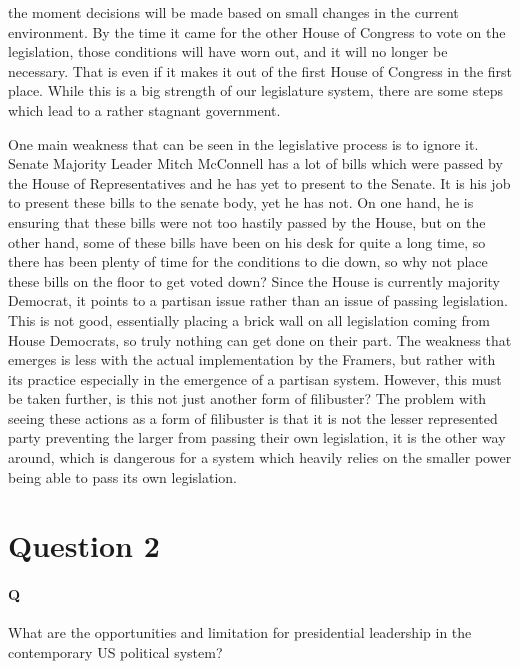 \documentclass[12pt]{article}
\begin{document}
the moment decisions will be made based on small changes in the
current environment. By the time it came for the other House of
Congress to vote on the legislation, those conditions will have worn
out, and it will no longer be necessary. That is even if it makes it
out of the first House of Congress in the first place. While this is a
big strength of our legislature system, there are some steps which
lead to a rather stagnant government.
\par
One main weakness that can be seen in the legislative process is to
ignore it. Senate Majority Leader Mitch McConnell has a lot of bills
which were passed by the House of Representatives and he has yet to
present to the Senate. It is his job to present these bills to the
senate body, yet he has not. On one hand, he is ensuring that these
bills were not too hastily passed by the House, but on the other hand,
some of these bills have been on his desk for quite a long time, so
there has been plenty of time for the conditions to die down, so why
not place these bills on the floor to get voted down? Since the House
is currently majority Democrat, it points to a partisan issue rather
than an issue of passing legislation. This is not good, essentially
placing a brick wall on all legislation coming from House Democrats,
so truly nothing can get done on their part. The weakness that emerges
is less with the actual implementation by the Framers, but rather with
its practice especially in the emergence of a partisan system.
However, this must be taken further, is this not just another form of
filibuster? The problem with seeing these actions as a form of
filibuster is that it is not the lesser represented party preventing
the larger from passing their own legislation, it is the other way
around, which is dangerous for a system which heavily relies on the
smaller power being able to pass its own legislation. 
\section*{Question 2}
\paragraph{Q}
What are the opportunities and limitation for presidential leadership
in the contemporary US political system?
\end{document}
